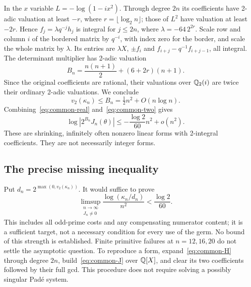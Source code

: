 In the $x$ variable $L=-\log(1-ix^2)$. Through degree $2n$ its
coefficients have 2-adic valuation at least $-r$, where
$r=\lfloor\log_2 n\rfloor$; those of $L^2$ have valuation at least
$-2r$. Hence $f_j=\lambda q^{-j}h_j$ is integral for $j\leq2n$,
where $\lambda=-64\,2^{2r}$. Scale row and column $i$ of the bordered
matrix by $q^{-i}$, with index zero for the border, and scale the whole
matrix by $\lambda$. Its entries are $\lambda X$, $\pm f_i$ and
$f_{i+j}-q^{-1}f_{i+j-1}$, all integral. The determinant multiplier has
2-adic valuation
\[
 B_n=\frac{n(n+1)}2+(6+2r)(n+1).
\]
Since the original coefficients are rational, their valuations over
$\mathbb Q_2(i)$ are twice their ordinary 2-adic valuations. We conclude
\begin{equation}\label{eq:common-two}
 v_2(\kappa_n)\leq B_n=\tfrac12n^2+O(n\log n).
\end{equation}
Combining~\eqref{eq:common-real} and~\eqref{eq:common-two} gives
\[
 \log|2^{B_n}J_n(\theta)|
       \leq-\frac{\log2}{60}n^2+o(n^2).
\]
These are shrinking, infinitely often nonzero linear forms with
2-integral coefficients. They are not necessarily integer forms.

\subsection{The precise missing inequality}
Put $d_n=2^{\max(0,v_2(\kappa_n))}$. It would suffice to prove
\begin{equation}\label{eq:common-missing}
 \limsup_{\substack{n\to\infty\\J_n\ne0}}
       \frac{\log(\kappa_n/d_n)}{n^2}<\frac{\log2}{60}.
\end{equation}
This includes all odd-prime costs and any compensating numerator
content; it is a sufficient target, not a necessary condition for every
use of the germ. No bound of this strength is established. Finite
primitive failures at $n=12,16,20$ do not settle the asymptotic question.
To reproduce a form, expand~\eqref{eq:common-H} through degree $2n$,
build~\eqref{eq:common-J} over $\mathbb Q[X]$, and clear its two coefficients
followed by their full gcd. This procedure does not require solving a
possibly singular Pad\'e system.

